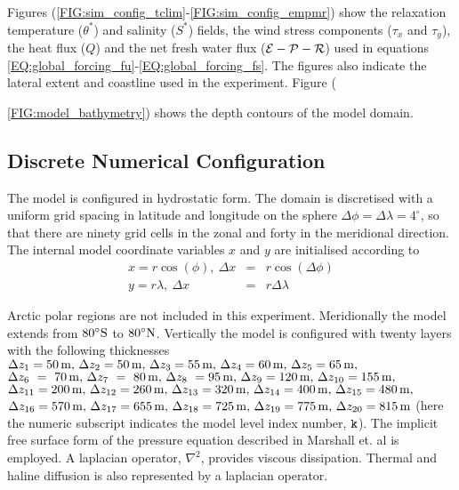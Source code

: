 Figures (\ref{FIG:sim_config_tclim}-\ref{FIG:sim_config_empmr}) show the
relaxation temperature ($\theta^{\ast}$) and salinity ($S^{\ast}$) fields,
the wind stress components ($\tau_x$ and $\tau_y$), the heat flux ($Q$)
and the net fresh water flux (${\cal E} - {\cal P} - {\cal R}$) used
in equations \ref{EQ:global_forcing_fu}-\ref{EQ:global_forcing_fs}. The figures
also indicate the lateral extent and coastline used in the experiment.
Figure ({\ref{FIG:model_bathymetry}) shows the depth contours of the model
domain.


\subsection{Discrete Numerical Configuration}


 The model is configured in hydrostatic form.  The domain is discretised with 
a uniform grid spacing in latitude and longitude on the sphere
 $\Delta \phi=\Delta \lambda=4^{\circ}$, so 
that there are ninety grid cells in the zonal and forty in the 
meridional direction. The internal model coordinate variables
$x$ and $y$ are initialised according to
\begin{eqnarray}
x=r\cos(\phi),~\Delta x & = &r\cos(\Delta \phi) \\
y=r\lambda,~\Delta x &= &r\Delta \lambda 
\end{eqnarray}

Arctic polar regions are not
included in this experiment. Meridionally the model extends from
$80^{\circ}{\rm S}$ to $80^{\circ}{\rm N}$.
Vertically the model is configured with twenty layers with the 
following thicknesses
$\Delta z_{1} = 50\,{\rm m},\,
 \Delta z_{2} = 50\,{\rm m},\,
 \Delta z_{3} = 55\,{\rm m},\,
 \Delta z_{4} = 60\,{\rm m},\,
 \Delta z_{5} = 65\,{\rm m},\,
$
$
 \Delta z_{6}~=~70\,{\rm m},\,
 \Delta z_{7}~=~80\,{\rm m},\,
 \Delta z_{8}~=95\,{\rm m},\,
 \Delta z_{9}=120\,{\rm m},\,
 \Delta z_{10}=155\,{\rm m},\,
$
$
 \Delta z_{11}=200\,{\rm m},\,
 \Delta z_{12}=260\,{\rm m},\,
 \Delta z_{13}=320\,{\rm m},\,
 \Delta z_{14}=400\,{\rm m},\,
 \Delta z_{15}=480\,{\rm m},\,
$
$
 \Delta z_{16}=570\,{\rm m},\,
 \Delta z_{17}=655\,{\rm m},\,
 \Delta z_{18}=725\,{\rm m},\,
 \Delta z_{19}=775\,{\rm m},\,
 \Delta z_{20}=815\,{\rm m}
$ (here the numeric subscript indicates the model level index number, ${\tt k}$).
The implicit free surface form of the pressure equation described in Marshall et. al 
\cite{Marshall97a} is employed. A laplacian operator, $\nabla^2$, provides viscous
dissipation. Thermal and haline diffusion is also represented by a laplacian operator.

}
